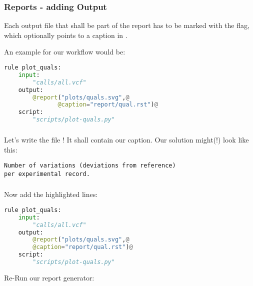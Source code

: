 \begin{frame}[fragile]
  \frametitle{\Snakemake{} Reports - adding Output}
  \begin{docs}
  	 Each output file that shall be part of the report has to be marked with the  flag, which optionally points to a caption in .
  \end{docs}
  An example for our workflow would be:
  \begin{lstlisting}[language=Python,style=Python]
rule plot_quals:
    input:
        "calls/all.vcf"
    output:
        @report("plots/quals.svg",@ 
               @caption="report/qual.rst")@
    script:
        "scripts/plot-quals.py"
  \end{lstlisting}
\end{frame}

\begin{frame}[fragile]
  \frametitle{}
  Let's write the file ! It shall contain our caption.
  \pause
  Our solution might(!) look like this:
  \begin{lstlisting}
Number of variations (deviations from reference) 
per experimental record. 
  \end{lstlisting}	
\end{frame}

\begin{frame}[fragile]
	\frametitle{}
	Now add the highlighted lines:
	\begin{lstlisting}[language=Python,style=Python]
rule plot_quals:
    input:
	    "calls/all.vcf"
	output:
		@report("plots/quals.svg",@ 
		@caption="report/qual.rst")@
	script:
		"scripts/plot-quals.py"
	\end{lstlisting}
    \begin{task}{Re-Run our report generator:}
    \end{task}
\end{frame}


